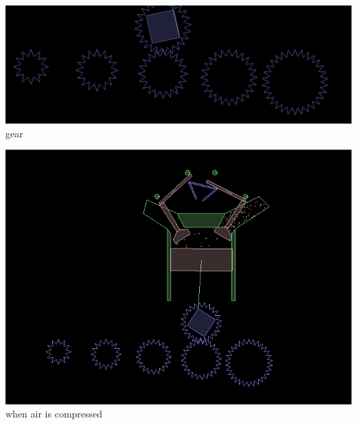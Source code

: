 \documentclass[40pt]{article}
\begin{document}
{\begin{description}
\begin{center}
\includegraphics[scale=0.3]{gear.png}\newline
\small{gear}
\end{center}

\begin{center}
\includegraphics[scale=0.5]{pic2.png}\newline
\small{when air is compressed}
\end{center}
\end{description}


}
\end{document}
